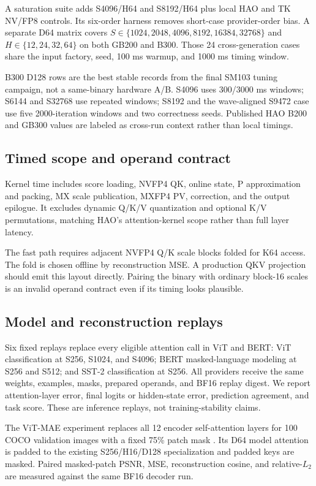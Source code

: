 A saturation suite adds S4096/H64 and S8192/H64 plus local HAO and TK NV/FP8
controls. Its six-order harness removes short-case provider-order bias. A
separate D64 matrix covers
$S\in\{1024,2048,4096,8192,16384,32768\}$ and
$H\in\{12,24,32,64\}$ on both GB200 and B300. Those 24 cross-generation cases
share the input factory, seed, 100 ms warmup, and 1000 ms timing window.

B300 D128 rows are the best stable records from the final SM103 tuning
campaign, not a same-binary hardware A/B. S4096 uses 300/3000 ms windows;
S6144 and S32768 use repeated windows; S8192 and the wave-aligned S9472 case
use five 2000-iteration windows and two correctness seeds. Published HAO B200
and GB300 values are labeled as cross-run context rather than local timings.

\subsection{Timed scope and operand contract}

Kernel time includes score loading, NVFP4 QK, online state, P approximation
and packing, MX scale publication, MXFP4 PV, correction, and the output
epilogue. It excludes dynamic Q/K/V quantization and optional K/V
permutations, matching HAO's attention-kernel scope rather than full layer
latency.

The fast path requires adjacent NVFP4 Q/K scale blocks folded for K64 access.
The fold is chosen offline by reconstruction MSE. A production QKV projection
should emit this layout directly. Pairing the binary with ordinary block-16
scales is an invalid operand contract even if its timing looks plausible.

\subsection{Model and reconstruction replays}

Six fixed replays replace every eligible attention call in ViT and BERT:
ViT classification at S256, S1024, and S4096; BERT masked-language modeling
at S256 and S512; and SST-2 classification at S256. All providers receive the
same weights, examples, masks, prepared operands, and BF16 replay digest. We
report attention-layer error, final logits or hidden-state error, prediction
agreement, and task score. These are inference replays, not training-stability
claims.

The ViT-MAE experiment replaces all 12 encoder self-attention layers for 100
COCO validation images with a fixed 75\% patch mask
\cite{he2022mae,lin2014coco}. Its D64 model attention is padded to the existing
S256/H16/D128 specialization and padded keys are masked. Paired masked-patch
PSNR, MSE, reconstruction cosine, and relative-$L_2$ are measured against the
same BF16 decoder run.

